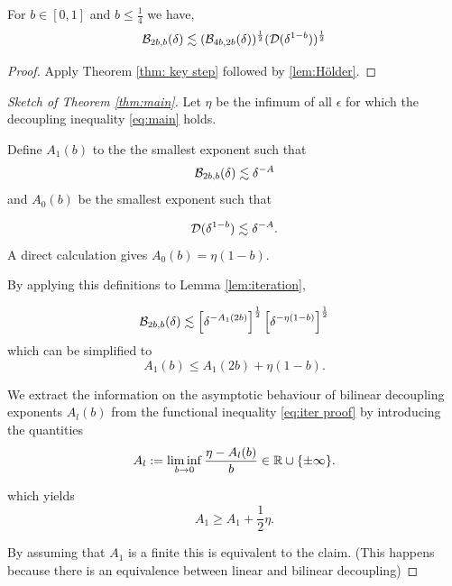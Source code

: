 \begin{lem}[Iteration]\label{lem:iteration}
For $b\in [0,1]$ and $b\leq \frac{1}{4}$ we have,
$$
\mathcal{B}_{2b,b}(\delta) \lesssim (\mathcal{B}_{4b,2b}(\delta)) ^{\frac{1}{2}}(\mathcal{D}(\delta^{1-b})) ^{\frac{1}{2}}
$$  
\end{lem}
\begin{proof}
    Apply Theorem \ref{thm: key step} followed by \ref{lem:Hölder}.
\end{proof}


\begin{proof}[Sketch of Theorem \ref{thm:main}]
Let $\eta$ be the infimum of all $\epsilon$ for which the decoupling inequality \eqref{eq:main} holds.

Define $A_1(b)$ to the the smallest exponent such that 
$$
\mathcal{B}_{2b,b}(\delta) \lesssim \delta^{-A}
$$
and $A_0(b)$ be the smallest exponent such that

$$
\mathcal{D}(\delta^{1-b}) \lesssim \delta ^{-A}.
$$
A direct calculation gives $A_0(b)=\eta(1-b)$.

By applying this definitions to Lemma \ref{lem:iteration},

$$
\mathcal{B}_{2b,b}(\delta) \lesssim \left[ \delta^{-A_{1}(2b)}\right]^{\frac{1}{2}}\left[ \delta^{-\eta(1-b)}\right]^{\frac{1}{2}}
$$
which can be simplified to 
\begin{equation}\label{eq:iter proof}
A_1(b) \leq A_{1}(2b) + \eta(1-b).
\end{equation}


We extract the information on the asymptotic behaviour of bilinear decoupling exponents $A_{l}(b)$ from the functional inequality \eqref{eq:iter proof} by introducing the quantities
$$
A_{l} := \liminf_{b\to 0} \frac{\eta - A_{l}(b)}{b} \in \mathbb{R} \cup \{\pm\infty\}.
$$

which yields
$$
A_1 \geq A_1 + \frac{1}{2} \eta.
$$

By assuming that $A_1$ is a finite this is equivalent to the claim. (This happens because there is an equivalence between linear and bilinear decoupling)


\end{proof}










































